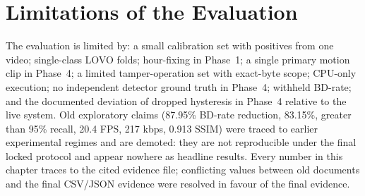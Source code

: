 \section{Limitations of the Evaluation}

The evaluation is limited by: a small calibration set with positives from one video; single-class LOVO folds; hour-fixing in Phase~1; a single primary motion clip in Phase~4; a limited tamper-operation set with exact-byte scope; CPU-only execution; no independent detector ground truth in Phase~4; withheld BD-rate; and the documented deviation of dropped hysteresis in Phase~4 relative to the live system. Old exploratory claims (87.95\% BD-rate reduction, 83.15\%, greater than 95\% recall, 20.4 FPS, 217 kbps, 0.913 SSIM) were traced to earlier experimental regimes and are demoted: they are not reproducible under the final locked protocol and appear nowhere as headline results. Every number in this chapter traces to the cited evidence file; conflicting values between old documents and the final CSV/JSON evidence were resolved in favour of the final evidence.
